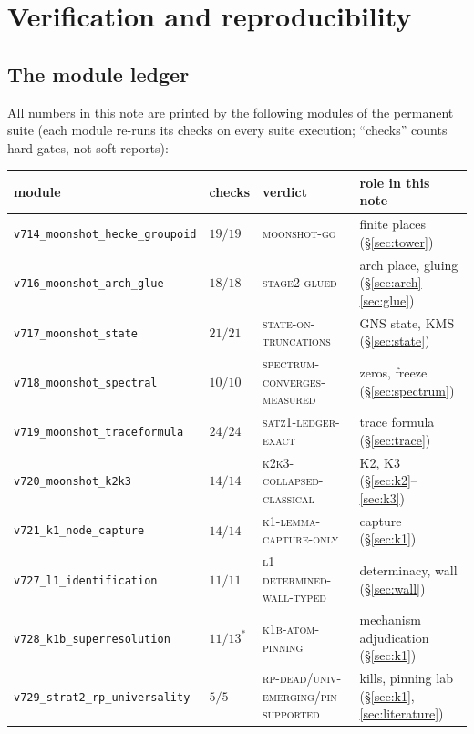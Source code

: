 \documentclass[11pt,a4paper]{article}
\theoremstyle{remark}
\begin{document}
\section{Verification and reproducibility}\label{sec:verification}

\subsection{The module ledger}
All numbers in this note are printed by the following modules of the
permanent suite (each module re-runs its checks on every suite
execution; ``checks'' counts hard gates, not soft reports):

\begin{center}
\scriptsize
\setlength{\tabcolsep}{3.5pt}
\begin{tabular}{@{}llll@{}}
\toprule
module & checks & verdict & role in this note\\
\midrule
\texttt{v714\_moonshot\_hecke\_groupoid} & $19/19$ &
\textsc{moonshot-go} & finite places (\S\ref{sec:tower})\\
\texttt{v716\_moonshot\_arch\_glue} & $18/18$ &
\textsc{stage2-glued} & arch place, gluing (\S\ref{sec:arch}--\ref{sec:glue})\\
\texttt{v717\_moonshot\_state} & $21/21$ &
\textsc{state-on-truncations} & GNS state, KMS (\S\ref{sec:state})\\
\texttt{v718\_moonshot\_spectral} & $10/10$ &
\textsc{spectrum-converges-measured} & zeros, freeze (\S\ref{sec:spectrum})\\
\texttt{v719\_moonshot\_traceformula} & $24/24$ &
\textsc{satz1-ledger-exact} & trace formula (\S\ref{sec:trace})\\
\texttt{v720\_moonshot\_k2k3} & $14/14$ &
\textsc{k2k3-collapsed-classical} & K2, K3 (\S\ref{sec:k2}--\ref{sec:k3})\\
\texttt{v721\_k1\_node\_capture} & $14/14$ &
\textsc{k1-lemma-capture-only} & capture (\S\ref{sec:k1})\\
\texttt{v727\_l1\_identification} & $11/11$ &
\textsc{l1-determined-wall-typed} & determinacy, wall (\S\ref{sec:wall})\\
\texttt{v728\_k1b\_superresolution} & $11/13^{\ast}$ &
\textsc{k1b-atom-pinning} & mechanism adjudication (\S\ref{sec:k1})\\
\texttt{v729\_strat2\_rp\_universality} & $5/5$ &
\textsc{rp-dead}/\textsc{univ-emerging}/\textsc{pin-supported} &
kills, pinning lab (\S\ref{sec:k1},\,\ref{sec:literature})\\

\end{tabular}
\end{center}
\end{document}
